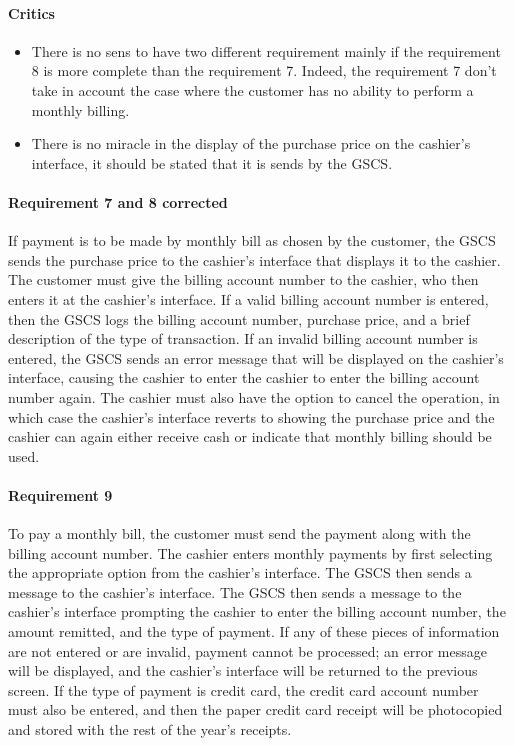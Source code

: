 \begin{framed}
    \paragraph{Critics}
    \begin{itemize}
        \item There is no sens to have two different requirement mainly
            if the requirement 8 is more complete than the requirement
            7. Indeed, the requirement 7 don't take in account the
            case where the customer has no ability to perform a
            monthly billing.
        \item There is no miracle in the display of the purchase price on the
        cashier's interface, it should be stated that it is sends by the GSCS.\@
    \end{itemize}

    \paragraph{Requirement 7 and 8 corrected} If payment is to be made by monthly bill as
    chosen by the customer, the GSCS sends the
    purchase price to the cashier's interface that displays it to the cashier.
    The customer must give the billing account number
    to the cashier, who then enters it at the cashier's interface. If a valid
    billing account number is entered, then the GSCS logs the billing account number, purchase
    price, and a brief description of the type of transaction. If an
    invalid billing account number is entered, the GSCS sends an error message
    that will be displayed on the cashier's interface, causing the cashier to
    enter the cashier to enter the billing account number again. The cashier must also have
    the option to cancel the operation, in which case the cashier's interface
    reverts to showing the purchase price and the cashier can again either
    receive cash or indicate that monthly billing should be used.
\end{framed}

\paragraph{Requirement 9} To pay a monthly bill, the customer must send
the payment along with the billing account number. The cashier enters
monthly payments by first selecting the appropriate option from the
cashier's interface. The GSCS then sends a message to the cashier's
interface. The GSCS then sends a message to the cashier's interface
prompting the cashier to enter the billing account number, the amount
remitted, and the type of payment. If any of these pieces of information
are not entered or are invalid, payment cannot be processed; an error
message will be displayed, and the cashier's interface will be returned
to the previous screen. If the type of payment is credit card, the credit
card account number must also be entered, and then the paper credit card
receipt will be photocopied and stored with the rest of the year's receipts.

